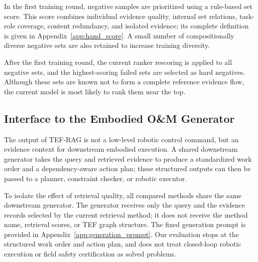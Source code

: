 In the first training round, negative samples are prioritized using a rule-based set score. This score combines individual evidence quality, internal set relations, task-role coverage, content redundancy, and isolated evidence; its complete definition is given in Appendix~\ref{app:hand_score}.  A small number of compositionally diverse negative sets are also retained to increase training diversity.

After the first training round, the current ranker rescoring is applied to all negative sets, and the highest-scoring failed sets are selected as hard negatives. Although these sets are known not to form a complete reference evidence flow, the current model is most likely to rank them near the top. 

\subsection{Interface to the Embodied O\&M Generator}

The output of TEF-RAG is not a low-level robotic control command, but an evidence context for downstream embodied execution. A shared downstream generator takes the query and retrieved evidence to produce a standardized work order and a dependency-aware action plan; these structured outputs can then be passed to a planner, constraint checker, or robotic executor.

To isolate the effect of retrieval quality, all compared methods share the same downstream generator. The generator receives only the query and the evidence records selected by the current retrieval method; it does not receive the method name, retrieval scores, or TEF graph structure. The fixed generation prompt is provided in Appendix~\ref{app:generation_prompt}. Our evaluation stops at the structured work order and action plan, and does not treat closed-loop robotic execution or field safety certification as solved problems.
